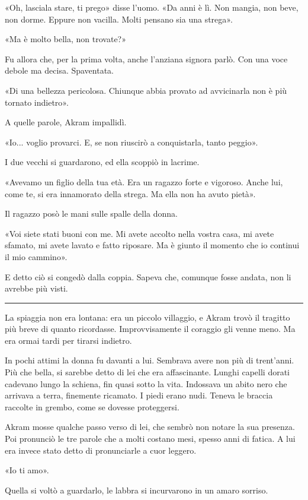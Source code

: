 «Oh, lasciala stare, ti prego» disse l'uomo. «Da anni è lì. Non mangia, non beve, non dorme. Eppure
non vacilla. Molti pensano sia una strega».

«Ma è molto bella, non trovate?»

Fu allora che, per la prima volta, anche l'anziana signora parlò. Con una voce debole ma decisa.
Spaventata.

«Di una bellezza pericolosa. Chiunque abbia provato ad avvicinarla non è più tornato indietro».

A quelle parole, Akram impallidì.

«Io... voglio provarci. E, se non riuscirò a conquistarla, tanto peggio».

I due vecchi si guardarono, ed ella scoppiò in lacrime.

«Avevamo un figlio della tua età. Era un ragazzo forte e vigoroso. Anche lui, come te, si era
innamorato della strega. Ma ella non ha avuto pietà».

Il ragazzo posò le mani sulle spalle della donna.

«Voi siete stati buoni con me. Mi avete accolto nella vostra casa, mi avete sfamato, mi avete lavato
e fatto riposare. Ma è giunto il momento che io continui il mio cammino».

E detto ciò si congedò dalla coppia. Sapeva che, comunque fosse andata, non li avrebbe più visti.

\plainbreak{1}

La spiaggia non era lontana: era un piccolo villaggio, e Akram trovò il tragitto più breve di quanto
ricordasse. Improvvisamente il coraggio gli venne meno. Ma era ormai tardi per tirarsi indietro.

In pochi attimi la donna fu davanti a lui. Sembrava avere non più di trent'anni. Più che bella, si
sarebbe detto di lei che era affascinante. Lunghi capelli dorati cadevano lungo la schiena, fin
quasi sotto la vita. Indossava un abito nero che arrivava a terra, finemente ricamato. I piedi erano
nudi. Teneva le braccia raccolte in grembo, come se dovesse proteggersi.

Akram mosse qualche passo verso di lei, che sembrò non notare la sua presenza. Poi pronunciò le tre
parole che a molti costano mesi, spesso anni di fatica. A lui era invece stato detto di pronunciarle
a cuor leggero.

«Io ti amo».

Quella si voltò a guardarlo, le labbra si incurvarono in un amaro sorriso.

